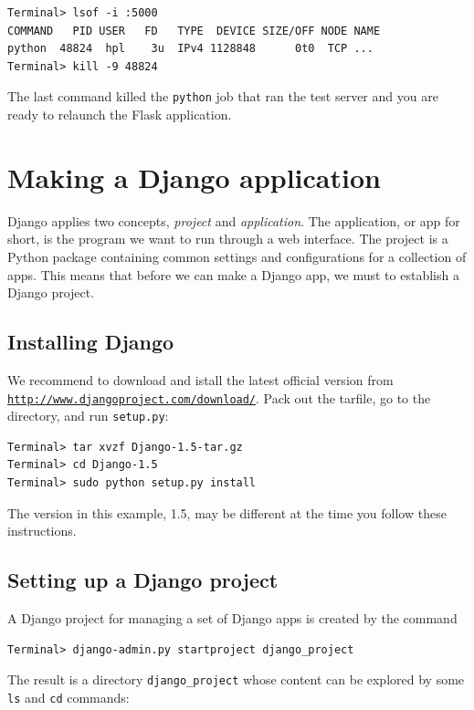 \documentclass[%
oneside,                 %
final,                   %
10pt]{article}
\begin{document}
\begin{Verbatim}[numbers=none,fontsize=\fontsize{9pt}{9pt},baselinestretch=0.85]
Terminal> lsof -i :5000
COMMAND   PID USER   FD   TYPE  DEVICE SIZE/OFF NODE NAME
python  48824  hpl    3u  IPv4 1128848      0t0  TCP ...
Terminal> kill -9 48824
\end{Verbatim}
The last command killed the \Verb!python! job that ran the test server and
you are ready to relaunch the Flask application.

\section{Making a Django application}

Django applies two concepts, \emph{project} and \emph{application}. The application,
or app for short,
is the program we want to run through a web interface. The project is
a Python package containing common settings and configurations for
a collection of apps. This means that before we can make a Django app,
we must to establish a Django project.

\subsection{Installing Django}


We recommend to
download and istall the latest official version from
\href{{http://www.djangoproject.com/download/}}{\nolinkurl{http://www.djangoproject.com/download/}}. Pack out the tarfile, go
to the directory, and run \Verb!setup.py!:

\begin{Verbatim}[numbers=none,fontsize=\fontsize{9pt}{9pt},baselinestretch=0.85]
Terminal> tar xvzf Django-1.5-tar.gz
Terminal> cd Django-1.5
Terminal> sudo python setup.py install
\end{Verbatim}
The version in this example, 1.5, may be different at the time you
follow these instructions.


\subsection{Setting up a Django project}


A Django project for managing a set of Django apps is
created by the command

\begin{Verbatim}[numbers=none,fontsize=\fontsize{9pt}{9pt},baselinestretch=0.85]
Terminal> django-admin.py startproject django_project
\end{Verbatim}
The result is a directory \Verb!django_project! whose content can be explored
by some \Verb!ls! and \Verb!cd! commands:
\end{document}
